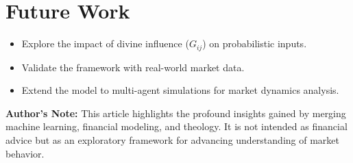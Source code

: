 \documentclass[a4]{article}
\newcommand{\bn}{\bigskip\noindent}
\begin{document}
\section{Future Work}

\begin{itemize}
\item  Explore the impact of divine influence ($G_{ij}$) on probabilistic inputs.
\item Validate the framework with real-world market data.
\item Extend the model to multi-agent simulations for market dynamics analysis.  
\end{itemize}

\bn
{\bf Author's Note:}   
This article highlights the profound insights gained by merging machine learning, financial modeling, and theology. It is not intended as financial advice but as an exploratory framework for advancing understanding of market behavior.
\end{document}
